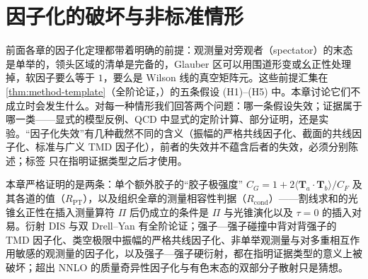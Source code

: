 \chapter{因子化的破坏与非标准情形}\label{ch:break}

前面各章的因子化定理都带着明确的前提：观测量对旁观者（spectator）的末态是单举的，领头区域的清单是完备的，Glauber 区可以用围道形变或幺正性处理掉，软因子要么等于 $1$，要么是 Wilson 线的真空矩阵元。这些前提汇集在\cref{thm:method-template}（全阶论证，\tagA）的五条假设 (H1)--(H5) 中。本章讨论它们不成立时会发生什么。对每一种情形我们回答两个问题：哪一条假设失效；证据属于哪一类——显式的模型反例、QCD 中显式的定阶计算、部分证明，还是实验。“因子化失效”有几种截然不同的含义（振幅的严格共线因子化、截面的共线因子化、标准与广义 TMD 因子化），前者的失效并不蕴含后者的失效，必须分别陈述；标签 \tagV 只在指明证据类型之后才使用。

本章严格证明的是两条：单个额外胶子的“胶子极强度” $C_G=1+2\langle\mathbf T_a\cdot\mathbf T_b\rangle/C_F$ 及其各道的值（$R_{\mathrm{PT}}$），以及组织全章的测量相容性判据（$R_{\mathrm{cond}}$）——割线求和的光锥幺正性在插入测量算符 $\Pi$ 后仍成立的条件是 $\Pi$ 与光锥演化以及 $\tau=0$ 的插入对易。衍射 DIS 与双 Drell--Yan 有全阶论证；强子—强子碰撞中背对背强子的 TMD 因子化、类空极限中振幅的严格共线因子化、非单举观测量与对多重相互作用敏感的观测量的因子化，以及强子—强子硬衍射，都在指明证据类型的意义上被破坏；超出 NNLO 的质量奇异性因子化与有色末态的双部分子散射只是猜想。

